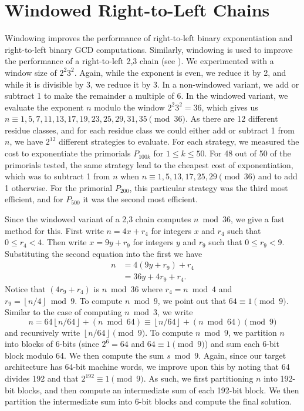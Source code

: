 \documentclass{ucalgthes1}
\theoremstyle{definition}
\newcommand{\floor}[1]{\left\lfloor #1 \right\rfloor}
\begin{document}
\section{Windowed Right-to-Left Chains}

Windowing improves the performance of right-to-left binary exponentiation and right-to-left binary GCD computations.  Similarly, windowing is used to improve the performance of a right-to-left 2,3 chain (see \cite{Doche2006}).  We experimented with a window size of $2^2 3^2$.  Again, while the exponent is even, we reduce it by 2, and while it is divisible by 3, we reduce it by 3.  In a non-windowed variant, we add or subtract 1 to make the remainder a multiple of 6.  In the windowed variant, we evaluate the exponent $n$ modulo the window $2^2 3^2 = 36$, which gives us $n \equiv 1, 5, 7, 11, 13, 17, 19, 23, 25, 29, 31, 35 \pmod {36}$.  As there are 12 different residue classes, and for each residue class we could either add or subtract 1 from $n$, we have $2^{12}$ different strategies to evaluate.  For each strategy, we measured the cost to exponentiate the primorials $P_{100k}$ for $1 \le k \le 50$.  For 48 out of 50 of the primorials tested, the same strategy lead to the cheapest cost of exponentiation, which was to subtract 1 from $n$ when $n \equiv 1, 5, 13, 17, 25, 29 \pmod{36}$ and to add 1 otherwise.  For the primorial $P_{200}$, this particular strategy was the third most efficient, and for $P_{500}$ it was the second most efficient.

Since the windowed variant of a 2,3 chain computes $n \bmod 36$, we give a fast method for this.  First write $n = 4x + r_4$ for integers $x$ and $r_4$ such that $0 \le r_4 < 4$.  Then write $x = 9y + r_9$ for integers $y$ and $r_9$ such that $0 \le r_9 < 9$.  Substituting the second equation into the first we have
\begin{align*}
	n &= 4(9y + r_9) + r_4 \\
	  &= 36y + 4r_9 + r_4.
\end{align*}
Notice that $(4r_9 + r_4)$ is $n \bmod {36}$ where $r_4 = n \bmod 4$ and $r_9 = \floor{n/4} \bmod 9$. To compute $n \bmod 9$, we point out that $64 \equiv 1 \pmod 9$.  Similar to the case of computing $n \bmod 3$, we write
\[
	n = 64 \floor{n/64} + (n \bmod 64) \equiv \floor{n/64} + (n \bmod 64) \pmod 9
\]
and recursively write $\floor{n/64} \pmod 9$.  To compute $n \bmod 9$, we partition $n$ into blocks of 6-bits (since $2^6 = 64$ and $64 \equiv 1 \pmod 9$) and sum each 6-bit block modulo 64.  We then compute the sum $s \bmod 9$.  Again, since our target architecture has 64-bit machine words, we improve upon this by noting that 64 divides 192 and that $2^{192} \equiv 1 \pmod 9$.  As such, we first partitioning $n$ into 192-bit blocks, and then compute an intermediate sum of each 192-bit block.  We then partition the intermediate sum into 6-bit blocks and compute the final solution.
\end{document}
